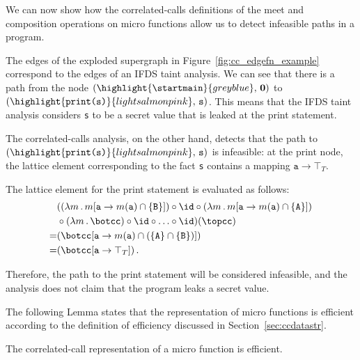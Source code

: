 We can now show how the correlated-calls definitions of the meet and composition operations on micro functions allow us to detect infeasible paths in a program.
\begin{example}\label{ex:cc}
  The edges of the exploded supergraph in Figure~\ref{fig:cc_edgefn_example} correspond to the edges of an IFDS taint analysis. We can see that there is a path from the node $(\highlight{\startmain}{greyblue},\,\mathbf0)$ to $(\highlight{\texttt{print(s)}}{lightsalmonpink},\,\texttt s)$. This means that the IFDS taint analysis considers \texttt s to be a secret value that is leaked at the print statement.
  
  The correlated-calls analysis, on the other hand, detects that the path to $(\highlight{\texttt{print(s)}}{lightsalmonpink},\,\texttt s)$ is infeasible: at the print node, the lattice element corresponding to the fact \verb's' contains a mapping $\texttt a\to\top_T$.
  
  The lattice element for the print statement is evaluated as follows:
  \begin{align*}
    &((\lambda m\,.\,m[\texttt a\to m(\texttt a)\cap\{\texttt B\}])\circ
    \id\circ
    (\lambda m\,.\,m[\texttt a\to m(\texttt a)\cap\{\texttt A\}])\\
    &\circ
    (\lambda m\,.\,\botcc)\circ
    \id\circ\ldots\circ\id)(\topcc)
    \\
    =&(\botcc[\texttt a\to m(\texttt a)\cap(\{\texttt A\}\cap\{\texttt B\})])
    \\
    =&(\botcc[\texttt a\to\top_T])\,.
  \end{align*}
  
  Therefore, the path to the print statement will be considered infeasible, and the analysis does not claim that the program leaks a secret value.
\end{example}

\begin{mdelete}
The following Lemma states that the representation of micro functions is efficient according to the definition  of efficiency discussed in Section~\ref{sec:ccdatastr}.
\end{mdelete}
\begin{lemma}\label{lem:efficient}
  The correlated-call representation of a micro function is efficient.
\end{lemma}


